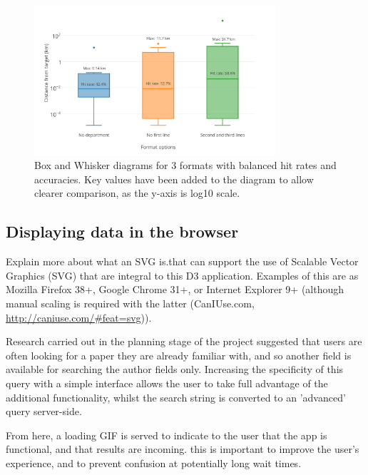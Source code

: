 \documentclass[Report.tex]{subfiles}
\begin{document}
\begin{figure}[!ht]
\begin{center}
	\includegraphics[width=0.8\textwidth]{../lib/images/distance-boxes}
	\caption{Box and Whisker diagrams for 3 formats with balanced hit rates and accuracies. Key values have been added to the diagram to allow clearer comparison, as the y-axis is log10 scale.\label{fig:geoboxes}}
\end{center}
\end{figure}

\subsection{Displaying data in the browser}
Explain more about what an SVG is.that can support the use of Scalable Vector Graphics (SVG) that are integral to this D3 application. Examples of this are as Mozilla Firefox 38+, Google Chrome 31+, or Internet Explorer 9+ (although manual scaling is required with the latter (CanIUse.com, \url{http://caniuse.com/#feat=svg})).

Research carried out in the planning stage of the project suggested that users are often looking for a paper they are already familiar with, and so another field is available for searching the author fields only. Increasing the specificity of this query with a simple interface allows the user to take full advantage of the additional functionality, whilst the search string is converted to an 'advanced' query server-side.

From here, a loading GIF is served to indicate to the user that the app is functional, and that results are incoming. this is important to improve the user's experience, and to prevent confusion at potentially long wait times.
\end{document}
